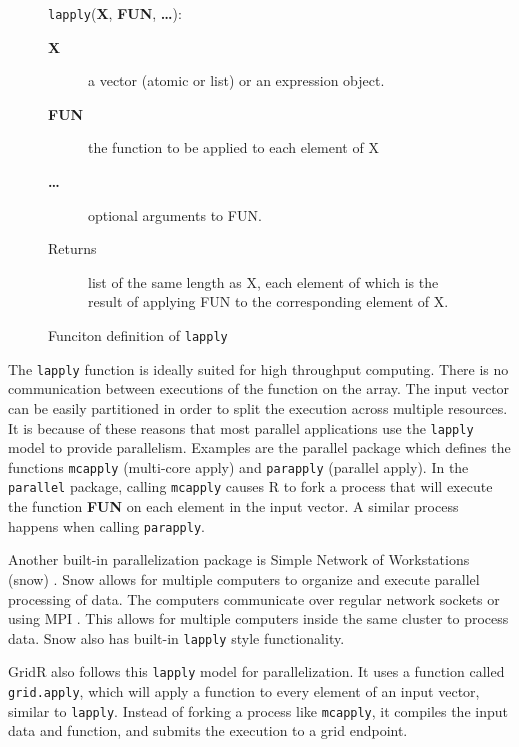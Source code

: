 \begin{figure}[h!t]
\begin{framed}
\texttt{lapply}(\textbf{X}, \textbf{FUN}, \textbf{\ldots}):
\begin{description}
\item[\textbf{X}] a vector (atomic or list) or an expression object.
\item[\textbf{FUN}] the function to be applied to each element of X
\item[\textbf{\ldots}] optional arguments to FUN.
\item[Returns] list of the same length as X, each element of which is the result of applying FUN to the corresponding element of X.
\end{description}
\end{framed}

\centering
\captionsetup{justification=centering}
\caption{Funciton definition of \texttt{lapply}}
\label{lst:lapply}
\end{figure}

The \texttt{lapply} function is ideally suited for high throughput computing.  There is no communication between executions of the function on the array.  The input vector can be easily partitioned in order to split the execution across multiple resources.  It is because of these reasons that most parallel applications use the \texttt{lapply} model to provide parallelism.  Examples are the parallel package which defines the functions \texttt{mcapply} (multi-core apply) and \texttt{parapply} (parallel apply). In the \texttt{parallel} package, calling \texttt{mcapply} causes R to fork a process that will execute the function \textbf{FUN} on each element in the input vector.  A similar process happens when calling \texttt{parapply}. 

Another built-in parallelization package is Simple Network of Workstations (snow) \cite{rlangsnow}.  Snow allows for multiple computers to organize and execute parallel processing of data.  The computers communicate over regular network sockets or using MPI \cite{gropp1999using}.  This allows for multiple computers inside the same cluster to process data.  Snow also has built-in \texttt{lapply} style functionality.

GridR also follows this \texttt{lapply} model for parallelization.  It uses a function called \texttt{grid.apply}, which will apply a function to every element of an input vector, similar to \texttt{lapply}.  Instead of forking a process like \texttt{mcapply}, it compiles the input data and function, and submits the execution to a grid endpoint.

